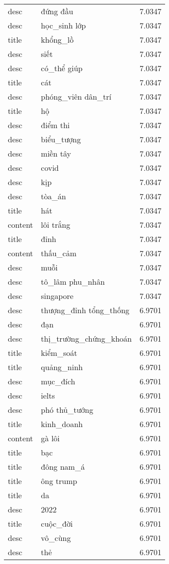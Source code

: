 \documentclass{article}
\begin{document}
\begin{tabular}{lll}
desc & đứng đầu & 7.0347\\
desc & học\_sinh lớp & 7.0347\\
title & khổng\_lồ & 7.0347\\
desc & siết & 7.0347\\
desc & có\_thể giúp & 7.0347\\
title & cát & 7.0347\\
desc & phóng\_viên dân\_trí & 7.0347\\
title & hộ & 7.0347\\
desc & điểm thi & 7.0347\\
desc & biểu\_tượng & 7.0347\\
desc & miền tây & 7.0347\\
desc & covid & 7.0347\\
desc & kịp & 7.0347\\
desc & tòa\_án & 7.0347\\
title & hát & 7.0347\\
content & lôi trắng & 7.0347\\
title & đỉnh & 7.0347\\
content & thấu\_cảm & 7.0347\\
desc & muỗi & 7.0347\\
desc & tô\_lâm phu\_nhân & 7.0347\\
desc & singapore & 7.0347\\
desc & thượng\_đỉnh tổng\_thống & 6.9701\\
desc & đạn & 6.9701\\
desc & thị\_trường\_chứng\_khoán & 6.9701\\
title & kiểm\_soát & 6.9701\\
title & quảng\_ninh & 6.9701\\
desc & mục\_đích & 6.9701\\
desc & ielts & 6.9701\\
desc & phó thủ\_tướng & 6.9701\\
title & kinh\_doanh & 6.9701\\
content & gà lôi & 6.9701\\
title & bạc & 6.9701\\
title & đông nam\_á & 6.9701\\
title & ông trump & 6.9701\\
title & da & 6.9701\\
desc & 2022 & 6.9701\\
title & cuộc\_đời & 6.9701\\
desc & vô\_cùng & 6.9701\\
desc & thẻ & 6.9701\\

\end{tabular}
\end{document}
